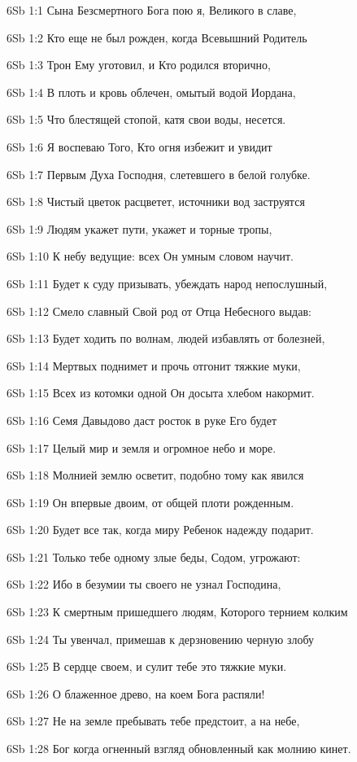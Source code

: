 \vs 6Sb 1:1 Сына Безсмертного Бога пою я, Великого в славе, 

\vs 6Sb 1:2 Кто еще не был рожден, когда Всевышний Родитель 

\vs 6Sb 1:3 Трон Ему уготовил, и Кто родился вторично, 

\vs 6Sb 1:4 В плоть и кровь облечен, омытый водой Иордана,

\vs 6Sb 1:5 Что блестящей стопой, катя свои воды, несется. 

\vs 6Sb 1:6 Я воспеваю Того, Кто огня избежит и увидит 

\vs 6Sb 1:7 Первым Духа Господня, слетевшего в белой голубке. 

\vs 6Sb 1:8 Чистый цветок расцветет, источники вод заструятся  

\vs 6Sb 1:9 Людям укажет пути, укажет и торные тропы,

\vs 6Sb 1:10 К небу ведущие: всех Он умным словом научит.

\vs 6Sb 1:11 Будет к суду призывать, убеждать народ непослушный, 

\vs 6Sb 1:12 Смело славный Свой род от Отца Небесного выдав: 

\vs 6Sb 1:13 Будет ходить по волнам, людей избавлять от болезней, 

\vs 6Sb 1:14 Мертвых поднимет и прочь отгонит тяжкие муки,

\vs 6Sb 1:15 Всех из котомки одной Он досыта хлебом накормит. 

\vs 6Sb 1:16 Семя Давыдово даст росток  в руке Его будет 

\vs 6Sb 1:17 Целый мир и земля и огромное небо и море. 

\vs 6Sb 1:18 Молнией землю осветит, подобно тому как явился 

\vs 6Sb 1:19 Он впервые двоим, от общей плоти рожденным.

\vs 6Sb 1:20 Будет все так, когда миру Ребенок надежду подарит.

\vs 6Sb 1:21 Только тебе одному злые беды, Содом, угрожают:

\vs 6Sb 1:22 Ибо в безумии ты своего не узнал Господина,

\vs 6Sb 1:23 К смертным пришедшего людям, Которого тернием колким

\vs 6Sb 1:24 Ты увенчал, примешав к дерзновению черную злобу 

\vs 6Sb 1:25 В сердце своем, и сулит тебе это тяжкие муки. 

\vs 6Sb 1:26 О блаженное древо, на коем Бога распяли! 

\vs 6Sb 1:27 Не на земле пребывать тебе предстоит, а на небе, 

\vs 6Sb 1:28 Бог когда огненный взгляд обновленный как молнию кинет.
